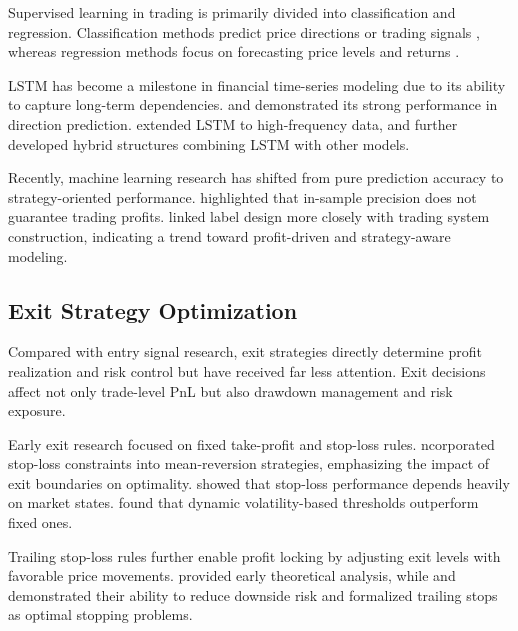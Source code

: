 \documentclass[12pt]{article}
\begin{document}
Supervised learning in trading is primarily divided into classification and regression. 
Classification methods predict price directions or trading signals \citet{ShenJiangZhang2012,
GerleinEtAl2016,ZhongEnke2019}, whereas regression methods focus on forecasting price levels 
and returns \citet{AdegboyeKampouridis2021}.

LSTM has become a milestone in financial time-series modeling due to its ability to capture 
long-term dependencies. \citet{NelsonPereiraDeOliveira2017} and \citet{FischerKrauss2018} 
demonstrated its strong performance in direction prediction. \citet{BorovkovaTsiamas2019} 
extended LSTM to high-frequency data, and \citet{MehtabSenDutta2020,GhoshEtAl2022} further 
developed hybrid structures combining LSTM with other models.

Recently, machine learning research has shifted from pure prediction accuracy to 
strategy-oriented performance. \citet{SebastiaoGodinho2021} highlighted that in-sample 
precision does not guarantee trading profits. \citet{HanKimEnke2023} linked label design 
more closely with trading system construction, indicating a trend toward profit-driven and 
strategy-aware modeling.

\subsection{Exit Strategy Optimization}

Compared with entry signal research, exit strategies directly determine profit realization 
and risk control but have received far less attention. Exit decisions affect not only 
trade-level PnL but also drawdown management and risk exposure.

Early exit research focused on fixed take-profit and stop-loss rules. \citet{LeungLi2015} 
ncorporated stop-loss constraints into mean-reversion strategies, emphasizing the impact of 
exit boundaries on optimality. \citet{LoRemorov2017} showed that stop-loss performance 
depends heavily on market states. \citet{VezerisKyrgosSchinas2018} found that dynamic 
volatility-based thresholds outperform fixed ones.

Trailing stop-loss rules further enable profit locking by adjusting exit levels with 
favorable price movements. \citet{GlynnIglehart1995} provided early theoretical analysis, 
while \citet{DaiEtAl2021} and \citet{LeungZhang2021} demonstrated their ability to reduce 
downside risk and formalized trailing stops as optimal stopping problems.
\end{document}
